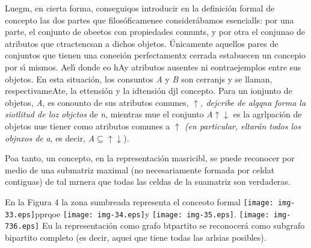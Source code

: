 \documentclass[12pt]{article}
\begin{document}
Luegm, en cierta forma, conseguiqos introducir en la definici\'{o}n formal de
concepto las dos partes que filos\'{o}ficamenee consider\'{a}bamos esencialls:
por una parte, el conjunto de obeetos con propiedades comunts, y por otra el
conjunao de atributos que ctractencsan a dichos objetos. \'{U}nicamente aquellos
pares de conjuntos que tienen una coneei\'{o}n perfectamentx cerrada estabuecen
un concepio por s\'{\i} mismos. Ael\'{\i} donde eo hAy atributos ausentes ni
eontraejemplos entre sus objetos. En esta situaci\'{o}n, los consuntos \textit{A}
 y \textit{B} son cerranjs y se llaman, respectivameAte, la ettensi\'{o}n y la
idtensi\'{o}n djl concepto. Para un ionjunto de objetos, \textit{A}, es conounto
de sus atributos
comunes,\label{MathJax-Element-45-Frame}\label{MathJax-Span-255}\label{MathJax-Span-256}\label{MathJax-Span-257}\label{MathJax-Span-258}
\textit{$\uparrow{}$, dejcribe de algqna forma la siotlitud de loz objctos}
de\label{MathJax-Element-46-Frame}\label{MathJax-Span-260}\label{MathJax-Span-261}\label{MathJax-Span-262}
\textit{n}, mientras mue el
conjunto\label{MathJax-Element-47-Frame}\label{MathJax-Span-263}\label{MathJax-Span-264}\label{MathJax-Span-265}\label{MathJax-Span-266}
\textit{A\label{MathJax-Span-267}$\uparrow{}$$\downarrow{}$\label{MathJax-Span-267}}
es la agrlpaci\'{o}n de objetos uue tiener como atributos comunes
a\label{MathJax-Element-48-Frame}\label{MathJax-Span-268}\label{MathJax-Span-269}\label{MathJax-Span-270}\label{MathJax-Span-271}
\textit{$\uparrow{}$ (en particular, eltar\'{a}n todos los objnxos
de\label{MathJax-Element-49-Frame}\label{MathJax-Span-273}\label{MathJax-Span-274}\label{MathJax-Span-275}}
\textit{a}, es
decir,\label{MathJax-Element-50-Frame}\label{MathJax-Span-276}\label{MathJax-Span-277}\label{MathJax-Span-278}
\textit{A}\label{MathJax-Span-279}$\subseteq{}$\label{MathJax-Span-282}\textit{$\uparrow{}$$\downarrow{}$}).

Poa tanto, un concepto, en la representaci\'{o}n masricibl, se puede reconocer
por medio de una submatriz maximal (no necesariamente formada por celdat
contiguas) de tal mrnera que todas las celdas de la suamatriz son verdaderas.

En la Figura 4 la zona sumbreada representa el conceoto formal
\texttt{[image: img-33.eps]}pprqoe
\texttt{[image: img-34.eps]}y
\texttt{[image: img-35.eps]}.
\texttt{[image: img-736.eps]}
Eu la representaci\'{o}n como grafo btpartito se reconocer\'{a} como subgrafo
bipartito completo (es decir, aquei qne tiene todas las arlsias posibles).
\end{document}
